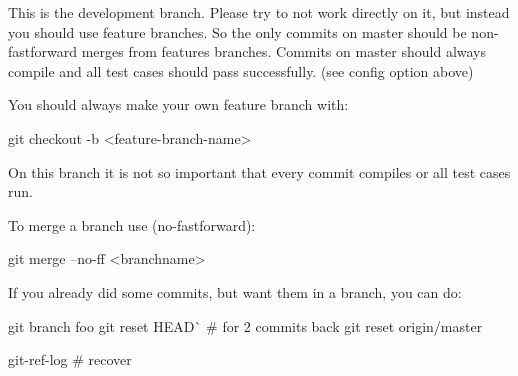 This is the development branch. Please try to not work directly on it, but instead you should use feature branches. So the only commits on master should be non-\/fastforward merges from features branches. Commits on master should always compile and all test cases should pass successfully. (see config option above)

You should always make your own feature branch with\+:


\begin{DoxyCode}
git checkout -b <feature-branch-name>
\end{DoxyCode}


On this branch it is not so important that every commit compiles or all test cases run.

To merge a branch use (no-\/fastforward)\+:


\begin{DoxyCode}
git merge --no-ff <branchname>
\end{DoxyCode}


If you already did some commits, but want them in a branch, you can do\+:


\begin{DoxyCode}
git branch foo
git reset HEAD^^  # for 2 commits back
git reset origin/master

git-ref-log # recover
\end{DoxyCode}
 